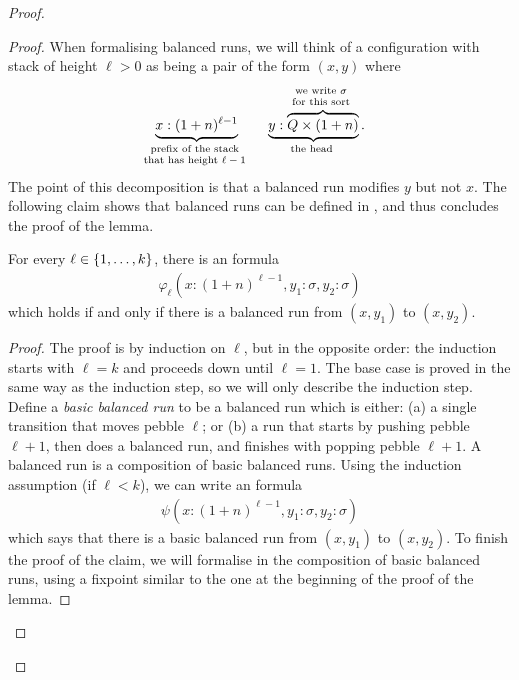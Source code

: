 \begin{proof}
\begin{proof}
    When formalising balanced runs, we will think of a configuration with stack of  height $\ell > 0$ as being a pair of the form $(x,y)$ where
        \begin{align*}
        \myunderbrace{x: (1+n)^{\ell-1}}{prefix of the  stack \\  that  has height $\ell-1$} \quad  \quad \myunderbrace{y: \myoverbrace{Q \times (1+n)}{we write $\sigma$ \\ for this sort}}{the head}.
        \end{align*}
    The point of this decomposition is that a balanced run modifies $y$ but not $x$.  The following claim shows that balanced runs can be defined in \mso, and thus concludes the proof of the lemma.
        \begin{claim}\label{claim:reachability-basic-run}
            For every $\ell \in \{1,\ldots,k\}$, there is an \mso formula
                \begin{align*}
    \varphi_\ell(x : (1+n)^{\ell-1}, y_1  : \sigma, y_2 : \sigma)
    \end{align*}
    which holds if and only if there is a balanced run from  $(x,y_1)$ to  $(x,y_2)$.
        \end{claim}
\begin{proof}
    The proof is by induction on $\ell$, but in the opposite order: the induction starts with $\ell=k$ and proceeds down until $\ell=1$. The base case is proved in the same way as the induction step, so we will only describe the induction step. Define a \emph{basic balanced run} to be a balanced run which is either: (a) a single transition that moves pebble $\ell$; or (b) a run that starts by pushing pebble $\ell+1$, then does a balanced run, and finishes with popping pebble $\ell+1$. A balanced run is a composition of basic balanced runs. Using the induction assumption (if $\ell < k$), we can write an \mso formula 
    \begin{align*}
    \psi(x : (1+n)^{\ell-1}, y_1  : \sigma, y_2 : \sigma)
    \end{align*}
    which says that there is a basic balanced run from  $(x,y_1)$ to  $(x,y_2)$.  To finish the proof of the claim, we will formalise in \mso the composition of basic balanced runs, using a fixpoint similar to the one at the beginning of the proof of the lemma.

\end{proof}
\end{proof}
\end{proof}
